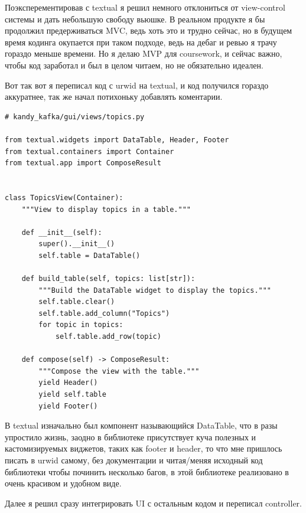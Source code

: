 \documentclass[10pt , a4paper]{report}
\newenvironment{code}{\captionsetup{type=listing}}{}
\begin{document}
Поэксперементировав с textual я решил немного отклониться от view-control системы и дать небольшую свободу вьюшке. В реальном продукте я бы продолжил предерживаться MVC, ведь хоть это и трудно сейчас, но в будущем время кодинга окупается при таком подходе, ведь на дебаг и ревью я трачу гораздо меньше времени. Но я делаю MVP для coursework, и сейчас важно, чтобы код заработал и был в целом читаем, но не обязательно идеален.

Вот так вот я переписал код с urwid на textual, и код получился гораздо аккуратнее, так же начал потихоньку добавлять коментарии.

\begin{code}
  \begin{verbatim}
# kandy_kafka/gui/views/topics.py
  
from textual.widgets import DataTable, Header, Footer
from textual.containers import Container
from textual.app import ComposeResult


class TopicsView(Container):
    """View to display topics in a table."""

    def __init__(self):
        super().__init__()
        self.table = DataTable()

    def build_table(self, topics: list[str]):
        """Build the DataTable widget to display the topics."""
        self.table.clear()
        self.table.add_column("Topics")
        for topic in topics:
            self.table.add_row(topic)

    def compose(self) -> ComposeResult:
        """Compose the view with the table."""
        yield Header()
        yield self.table
        yield Footer()

  \end{verbatim}
\end{code}

В textual изначально был компонент называющийся DataTable, что в разы упростило жизнь, заодно в библиотеке присутствует куча полезных и кастомизируемых виджетов, таких как footer и header, то что мне пришлось писать в urwid самому, без документации и читая/меняя исходный код библиотеки чтобы починить несколько багов, в этой библиотеке реализовано в очень красивом и удобном виде.

Далее я решил сразу интегрировать UI с остальным кодом и переписал controller. 
\end{document}
